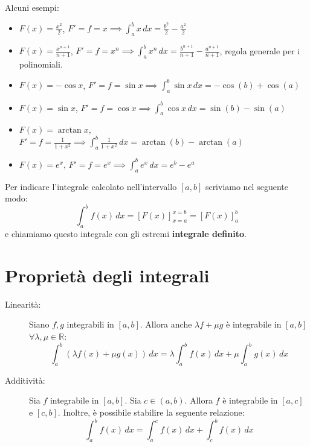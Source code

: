 \documentclass[12pt]{report}
\newcommand{\R}{\mathbb{R}}
\begin{document}
	Alcuni esempi:
	\begin{itemize}
		
		\item $F(x) = \frac{x^2}{2}$, $F' = f = x \implies \int_{a}^{b} x \, dx = \frac{b^2}{2} - \frac{a^2}{2}$
		
		\item $F(x) = \frac{x^{n+1}}{n+1}$, $F' = f = x^n \implies \int_{a}^{b} x^n \, dx = \frac{b^{n+1}}{n+1} - \frac{a^{n+1}}{n+1}$, regola generale per i polinomiali.
		
		\item $F(x) = -\cos x$, $F' = f = \sin x \implies \int_{a}^{b} \sin x \, dx = -\cos(b) + \cos(a)$
		
		\item $F(x) = \sin x$, $F' = f = \cos x \implies \int_{a}^{b} \cos x \, dx = \sin(b) - \sin(a)$
		
		\item $F(x) = \arctan x$, $F' = f = \frac{1}{1+x^2} \implies \int_{a}^{b} \frac{1}{1+x^2} \, dx = \arctan(b) - \arctan(a)$
		
		\item $F(x) = e^x$, $F' = f = e^x \implies \int_{a}^{b} e^x \, dx = e^b - e^a$
		
	\end{itemize}
	
	\begin{osservazione}{}{}
		Per indicare l'integrale calcolato nell'intervallo $[a, b]$ scriviamo nel seguente modo:
		\[
		\int_{a}^{b} f(x) \, dx = [F(x)]_{x=a}^{x=b} = [F(x)]_{a}^{b}
		\]
		e chiamiamo questo integrale con gli estremi \textbf{integrale definito}.
	\end{osservazione}
	
	\section{Proprietà degli integrali}
	
	\begin{description}
		
		\item [Linearità:] Siano $f, g$ integrabili in $[a, b]$. 
		Allora anche $\lambda f + \mu g$ è integrabile in $[a, b]$ $\forall \lambda, \mu \in \R$:
		\[
		\int_{a}^{b} (\lambda f(x) + \mu g(x)) \, dx = \lambda \int_{a}^{b} f(x) \, dx + \mu \int_{a}^{b} g(x) \, dx
		\]
		
		\item [Additività:] Sia $f$ integrabile in $[a, b]$. Sia $c \in (a, b)$. Allora $f$ è integrabile in $[a, c]$ e $[c, b]$. Inoltre, è possibile stabilire la seguente relazione:
		\[
		\int_{a}^{b} f(x) \, dx = \int_{a}^{c} f(x) \, dx + \int_{c}^{b} f(x) \, dx
		\]
		
	\end{description}
	
\end{document}
